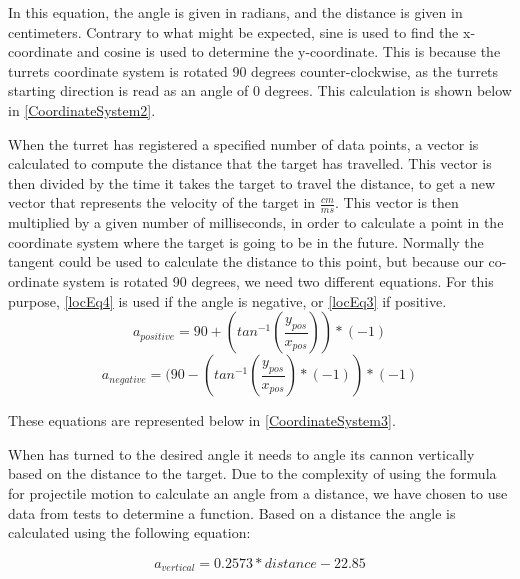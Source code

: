 In this equation, the angle  is given in radians, and the distance
 is given in centimeters. Contrary to what might be expected, sine
is used to find the x-coordinate and cosine is used to determine the
y-coordinate. This is because the turrets coordinate system is rotated 90
degrees counter-clockwise, as the turrets starting direction is read as an angle
of 0 degrees. This calculation is shown below in \autoref{CoordinateSystem2}.


When the turret has registered a specified number of data points, a vector is
calculated to compute the distance that the target has travelled. This vector is
then divided by the time it takes the target to travel the distance, to get a
new vector that represents the velocity of the target in $\frac{cm}{ms}$. This
vector is then multiplied by a given number of milliseconds, in order to
calculate a point in the coordinate system where the target is going to be in
the future. Normally the tangent could be used to calculate the distance
to this point, but because our co-ordinate system is rotated 90 degrees, we need
two different equations. For this purpose, \autoref{locEq4} is used if the angle
is negative, or \autoref{locEq3} if positive.
\begin{equation}\label{locEq3}
a_{positive}=90+(tan^{-1}(\frac{y_{pos}}{x_{pos}}))*(-1)
\end{equation} 
\begin{equation}\label{locEq4}
a_{negative}=(90-(tan^{-1}(\frac{y_{pos}}{x_{pos}})*(-1))*(-1)
\end{equation} 

These equations are represented below in \autoref{CoordinateSystem3}.


When \name has turned to the desired angle it needs to angle its cannon
vertically based on the distance to the target. Due to the complexity of using
the formula for projectile motion to calculate an angle from a distance, we have
chosen to use data from tests to determine a function. Based on a distance the
angle is calculated using the following equation:

\begin{equation}\label{locEq5}
a_{vertical}=0.2573*distance-22.85
\end{equation} 

